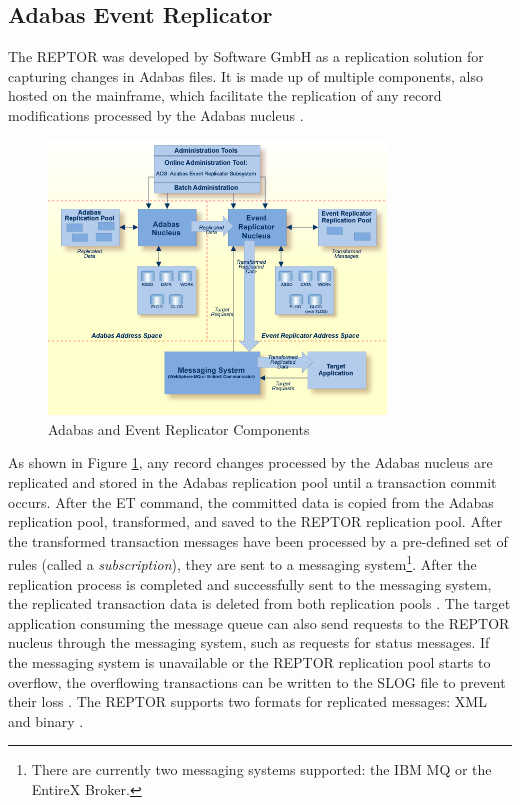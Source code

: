 \subsection{Adabas Event Replicator}
\label{ch02:fundamentals:adabas:reptor}
The \ac{REPTOR} was developed by Software GmbH as a replication solution for capturing changes in Adabas files. It is made up of multiple components, also hosted on the mainframe, which facilitate the replication of any record modifications processed by the Adabas nucleus \cite{storr2011reptor}.

\begin{figure}[htbp]
 \centering
 \includegraphics[width=0.8\textwidth]{chapters/images/reptor_architecture.png}
 \caption{Adabas and Event Replicator Components \cite{reptorconcepts}}
 \label{fig:fundamentals:reptorarchitecture}
\end{figure}

As shown in Figure \ref{fig:fundamentals:reptorarchitecture}, any record changes processed by the Adabas nucleus are replicated and stored in the Adabas replication pool until a transaction commit occurs. After the \ac{ET} command, the committed data is copied from the Adabas replication pool, transformed, and saved to the \ac{REPTOR} replication pool. After the transformed transaction messages have been processed by a pre-defined set of rules (called a \textit{subscription}), they are sent to a messaging system\footnote{There are currently two messaging systems supported: the IBM MQ or the EntireX Broker.}. After the replication process is completed and successfully sent to the messaging system, the replicated transaction data is deleted from both replication pools \cite{reptorconcepts}. The target application consuming the message queue can also send requests to the \ac{REPTOR} nucleus through the messaging system, such as requests for status messages. If the messaging system is unavailable or the \ac{REPTOR} replication pool starts to overflow, the overflowing transactions can be written to the \ac{SLOG} file to prevent their loss \cite{storr2011reptor}. The \ac{REPTOR} supports two formats for replicated messages: XML and binary \cite{artconcepts}.


